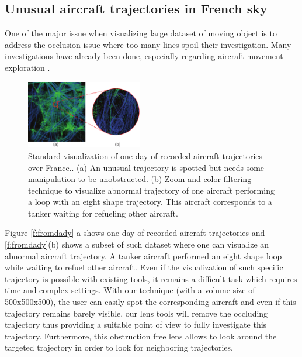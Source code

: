 \subsection{Unusual aircraft trajectories in French sky}


One of the major issue when visualizing large dataset of moving object is to address the occlusion issue where too many lines spoil their investigation. Many investigations have already been done, especially regarding aircraft movement exploration \cite{hurter2014interactive}.
\begin{figure} 
\includegraphics [width=0.45\textwidth]{images/aircraft.pdf} 
\caption{ Standard visualization of one day of recorded aircraft trajectories over France.\cite{hurter2009fromdady}. (a) An unusual trajectory is spotted but needs some manipulation to be unobstructed. (b) Zoom and color filtering technique to visualize abnormal trajectory of one aircraft performing a loop with an eight shape trajectory. This aircraft corresponds to a tanker waiting for refueling other aircraft.}
\label{f:fromdady}
\end{figure}
Figure \autoref{f:fromdady}-a shows one day of recorded aircraft trajectories and \autoref{f:fromdady}(b) shows a subset of such dataset where one can visualize an abnormal aircraft trajectory. A tanker aircraft performed an eight shape loop while waiting to refuel other aircraft. Even if the visualization of such specific trajectory is possible with existing tools, it remains a difficult task which requires time and complex settings. With our technique (with a volume size of 500x500x500), the user can easily spot the corresponding aircraft and even if this trajectory remains barely visible, our lens tools will remove the occluding trajectory thus providing a suitable point of view to fully investigate this trajectory. Furthermore, this obstruction free lens allows to look around the targeted trajectory in order to look for neighboring trajectories.

